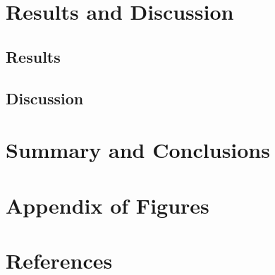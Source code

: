 \documentclass{scrartcl}
\begin{document}
\section{Results and Discussion}
\subsection{Results}
\subsection{Discussion}

\section{Summary and Conclusions}

\section{Appendix of Figures}

\FloatBarrier
\section{References}



\end{document}
